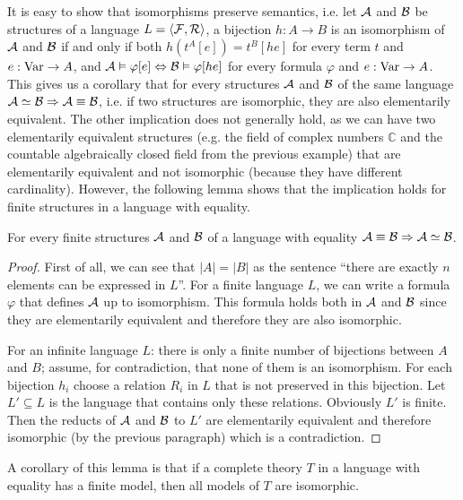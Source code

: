 It is easy to show that isomorphisms preserve semantics, i.e. let $\mathcal{A}$ and $\mathcal{B}$ be structures of a language $L = \langle \mathcal{F}, \mathcal{R} \rangle$, a bijection $h: A \to B$ is an isomorphism of $\mathcal{A}$ and $\mathcal{B}$ if and only if both $h(t^A[e])=t^B[he]$ for every term $t$ and $e: \operatorname{Var} \to A$, and $\mathcal{A} \vDash \varphi[e] \Leftrightarrow \mathcal{B} \vDash \varphi[he]$ for every formula $\varphi$ and $e: \operatorname{Var} \to A$. This gives us a corollary that for every structures $\mathcal{A}$ and $\mathcal{B}$ of the same language $\mathcal{A} \simeq \mathcal{B} \Rightarrow \mathcal{A} \equiv \mathcal{B}$, i.e. if two structures are isomorphic, they are also elementarily equivalent. The other implication does not generally hold, as we can have two elementarily equivalent structures (e.g. the field of complex numbers $\mathbb{C}$ and the countable algebraically closed field from the previous example) that are elementarily equivalent and not isomorphic (because they have different cardinality). However, the following lemma shows that the implication holds for finite structures in a language with equality.

\begin{lemma}
For every finite structures $\mathcal{A}$ and $\mathcal{B}$ of a language with equality $\mathcal{A} \equiv \mathcal{B} \Rightarrow \mathcal{A} \simeq \mathcal{B}$.
\end{lemma}
\begin{proof}
First of all, we can see that $|A| = |B|$ as the sentence ``there are exactly $n$ elements can be expressed in $L$''. For a finite language $L$, we can write a formula $\varphi$ that defines $\mathcal{A}$ up to isomorphism. This formula holds both in $\mathcal{A}$ and $\mathcal{B}$ since they are elementarily equivalent and therefore they are also isomorphic.

For an infinite language $L$: there is only a finite number of bijections between $A$ and $B$; assume, for contradiction, that none of them is an isomorphism. For each bijection $h_i$ choose a relation $R_i$ in $L$ that is not preserved in this bijection. Let $L' \subseteq L$ is the language that contains only these relations. Obviously $L'$ is finite. Then the reducts of $\mathcal{A}$ and $\mathcal{B}$ to $L'$ are elementarily equivalent and therefore isomorphic (by the previous paragraph) which is a contradiction.
\end{proof}

A corollary of this lemma is that if a complete theory $T$ in a language with equality has a finite model, then all models of $T$ are isomorphic.

